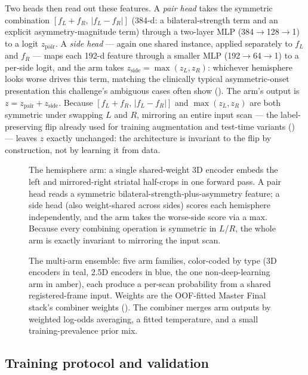 \documentclass[11pt]{article}
\begin{document}
Two heads then read out these features. A \emph{pair head} takes the symmetric combination $[f_L+f_R,\,|f_L-f_R|]$ (384-d: a bilateral-strength term and an explicit asymmetry-magnitude term) through a two-layer MLP (384$\to$128$\to$1) to a logit $z_{\text{pair}}$. A \emph{side head} --- again one shared instance, applied separately to $f_L$ and $f_R$ --- maps each 192-d feature through a smaller MLP (192$\to$64$\to$1) to a per-side logit, and the arm takes $z_{\text{side}} = \max(z_L, z_R)$: whichever hemisphere looks worse drives this term, matching the clinically typical asymmetric-onset presentation this challenge's ambiguous cases often show (). The arm's output is $z = z_{\text{pair}} + z_{\text{side}}$. Because $[f_L+f_R,\,|f_L-f_R|]$ and $\max(z_L,z_R)$ are both symmetric under swapping $L$ and $R$, mirroring an entire input scan --- the label-preserving flip already used for training augmentation and test-time variants () --- leaves $z$ exactly unchanged: the architecture is invariant to the flip by construction, not by learning it from data.

\begin{figure}[t]
\centering

\caption{The hemisphere arm: a single shared-weight 3D encoder embeds the left and mirrored-right striatal half-crops in one forward pass. A pair head reads a symmetric bilateral-strength-plus-asymmetry feature; a side head (also weight-shared across sides) scores each hemisphere independently, and the arm takes the worse-side score via a max. Because every combining operation is symmetric in $L$/$R$, the whole arm is exactly invariant to mirroring the input scan.}
\label{fig:hemi}
\end{figure}

\begin{figure}[t]
\centering
\resizebox{\textwidth}{!}{}
\caption{The multi-arm ensemble: five arm families, color-coded by type (3D encoders in teal, 2.5D encoders in blue, the one non-deep-learning arm in amber), each produce a per-scan probability from a shared registered-frame input. Weights are the OOF-fitted Master Final stack's combiner weights (). The combiner merges arm outputs by weighted log-odds averaging, a fitted temperature, and a small training-prevalence prior mix.}
\label{fig:ensemble}
\end{figure}

\subsection{Training protocol and validation}
\label{sec:validation}
\end{document}
